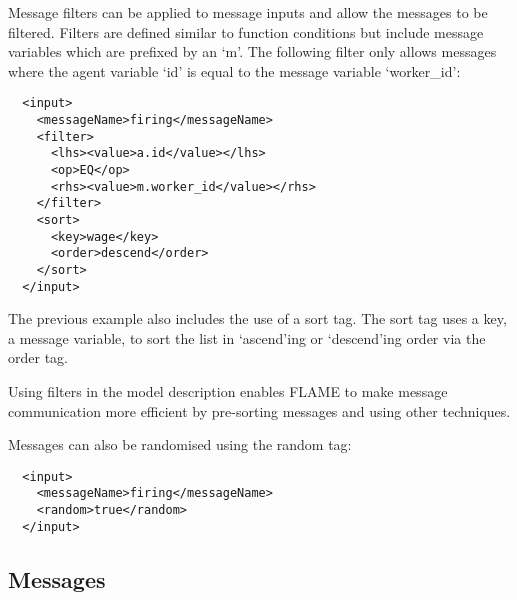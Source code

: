 Message filters can be applied to message inputs and allow the messages to be
filtered. Filters are defined similar to function conditions but include
message variables which are prefixed by an `m'. The following filter only
allows messages where the agent variable `id' is equal to the message variable
`worker\_id':

\begin{verbatim}
  <input>
    <messageName>firing</messageName>
    <filter>
      <lhs><value>a.id</value></lhs>
      <op>EQ</op>
      <rhs><value>m.worker_id</value></rhs>
    </filter>
    <sort>
      <key>wage</key>
      <order>descend</order>
    </sort>
  </input>
\end{verbatim}

The previous example also includes the use of a sort tag. The sort tag uses a
key, a message variable, to sort the list in `ascend'ing or `descend'ing order
via the order tag.

Using filters in the model description enables FLAME to make message
communication more efficient by pre-sorting messages and using other techniques.

Messages can also be randomised using the random tag:

\begin{verbatim}
  <input>
    <messageName>firing</messageName>
    <random>true</random>
  </input>
\end{verbatim}


\subsection{Messages}

